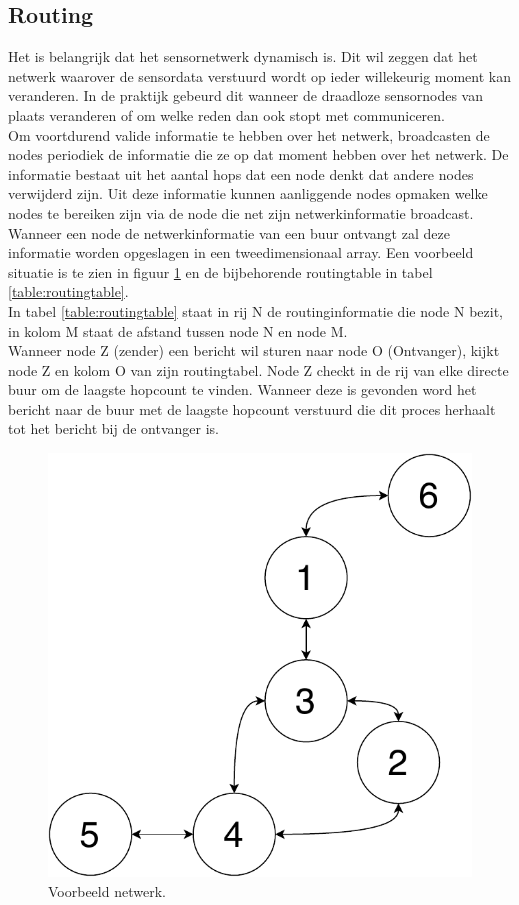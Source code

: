 \documentclass[a4paper, 11pt]{article}
\begin{document}
\subsection{Routing}
Het is belangrijk dat het sensornetwerk dynamisch is. Dit wil zeggen dat het netwerk waarover de sensordata verstuurd wordt op ieder willekeurig moment kan veranderen. In de praktijk gebeurd dit wanneer de draadloze sensornodes van plaats veranderen of om welke reden dan ook stopt met communiceren.\\
Om voortdurend valide informatie te hebben over het netwerk, broadcasten de nodes periodiek de informatie die ze op dat moment hebben over het netwerk. De informatie bestaat uit het aantal hops dat een node denkt dat andere nodes verwijderd zijn. Uit deze informatie kunnen aanliggende nodes opmaken welke nodes te bereiken zijn via de node die net zijn netwerkinformatie broadcast.\\
Wanneer een node de netwerkinformatie van een buur ontvangt zal deze informatie worden opgeslagen in een tweedimensionaal array. Een voorbeeld situatie is te zien in figuur \ref{fig:voorbeeld} en de bijbehorende routingtable in tabel \ref{table:routingtable}.\\
In tabel \ref{table:routingtable} staat in rij N de routinginformatie die node N bezit, in kolom M staat de afstand tussen node N en node M.\\
Wanneer node Z (zender) een bericht wil sturen naar node O (Ontvanger), kijkt node Z en kolom O van zijn routingtabel. Node Z checkt in de rij van elke directe buur om de laagste hopcount te vinden. Wanneer deze is gevonden word het bericht naar de buur met de laagste hopcount verstuurd die dit proces herhaalt tot het bericht bij de ontvanger is.
\begin{figure}
\centering
\includegraphics[width=.5\textwidth, keepaspectratio]{media/Voorbeeld_netwerk.pdf}
\caption{Voorbeeld netwerk.}
\label{fig:voorbeeld}
\end{figure}
\end{document}
